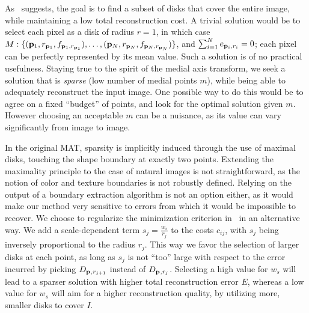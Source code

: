 \documentclass[10pt,twocolumn,letterpaper]{article}
\begin{document}
As~ suggests, the goal is to find a subset of disks that cover the entire image, while maintaining
a low total reconstruction cost. 
A trivial solution would be to select each pixel as a disk of radius $r=1$, in which case
$M:\{ (\mathbf{p}_{1},r_{\mathbf{p}_{1}},f_{\mathbf{p}_{1},r_{\mathbf{p}_{1}}}), \ldots, ( \mathbf{p}_{N},r_{\mathbf{p}_{N}},f_{\mathbf{p}_{N},r_{\mathbf{p}_{N}}} ) \}$,
and $\sum_{i=1}^N e_{\mathbf{p}_{i},r_i} = 0$; each pixel can be perfectly represented by its mean value.
Such a solution is of no practical usefulness. 
Staying true to the spirit of the medial axis transform, we seek a solution that is \emph{sparse}
(low number of medial points $m$), while being able to adequately reconstruct the input image.
One possible way to do this would be to agree on a fixed ``budget'' of points, and look for the 
optimal solution given $m$.
However choosing an acceptable $m$ can be a nuisance, as its value can vary significantly  from image to image.

In the original MAT, sparsity is implicitly induced through the use of maximal disks,
touching the shape boundary at exactly two points.
Extending the maximality principle to the case of natural images is not straightforward,
as the notion of color and texture boundaries is not robustly defined.
Relying on the output of a boundary extraction algorithm is not an option either,
as it would make our method very sensitive to errors from which it would be impossible to recover.
We choose to regularize the minimization criterion in~ in an alternative way. 
We add a scale-dependent term $s_j = \frac{w_s}{r_j}$ to the costs $c_{ij}$, with $s_j$ 
being inversely proportional to the radius $r_j$.
This way we favor the selection of larger disks at each point, as long as $s_j$ is not ``too'' large
with respect to the error incurred by picking $D_{\mathbf{p}_{},r_{j+1}}$ instead of $D_{\mathbf{p}_{},r_j}$.
Selecting a high value for $w_s$ will lead to a sparser solution with higher total reconstruction error $E$,
whereas a low value for $w_s$ will aim for a higher reconstruction quality, by utilizing more, smaller disks
to cover $I$.
\end{document}
